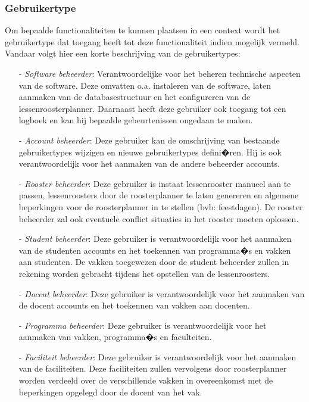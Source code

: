 \documentclass{article}
\begin{document}
\subsubsection{Gebruikertype}
Om bepaalde functionaliteiten te kunnen plaatsen in een context wordt het gebruikertype dat toegang heeft tot deze functionaliteit indien mogelijk vermeld. Vandaar volgt hier een korte beschrijving van de gebruikertypes:
\begin{itemize}
\item[-] \textit{Software beheerder}: Verantwoordelijke voor het beheren technische aspecten van de software. Deze omvatten o.a. instaleren van de software, laten aanmaken van de databasestructuur en het configureren van de lessenroosterplanner. Daarnaast heeft deze gebruiker ook toegang tot een logboek en kan hij bepaalde gebeurtenissen ongedaan te maken.
\item[-] \textit{Account beheerder}: Deze gebruiker kan de omschrijving van bestaande gebruikertypes wijzigen en nieuwe gebruikertypes defini�ren. Hij is ook verantwoordelijk voor het aanmaken van de andere beheerder accounts.
\item[-] \textit{Rooster beheerder}: Deze gebruiker is instaat lessenrooster manueel aan te passen, lessenroosters door de roosterplanner te laten genereren en algemene beperkingen voor de roosterplanner in te stellen (bvb: feestdagen). De rooster beheerder zal ook eventuele conflict situaties in het rooster moeten oplossen. 
\item[-] \textit{Student beheerder}: Deze gebruiker is verantwoordelijk voor het aanmaken van de studenten accounts en het toekennen van programma�s en vakken aan studenten. De vakken toegewezen door de student beheerder zullen in rekening worden gebracht tijdens het opstellen van de lessenroosters. 
\item[-] \textit{Docent beheerder}: Deze gebruiker is verantwoordelijk voor het aanmaken van de docent accounts en het toekennen van vakken aan docenten. 
\item[-] \textit{Programma beheerder}: Deze gebruiker is verantwoordelijk voor het aanmaken van vakken, programma�s en faculteiten.

\item[-] \textit{Faciliteit beheerder}: Deze gebruiker is verantwoordelijk voor het aanmaken van de faciliteiten. Deze faciliteiten zullen vervolgens door roosterplanner worden verdeeld over de verschillende vakken in overeenkomst met de beperkingen opgelegd door de docent van het vak.


\end{itemize}
\end{document}
